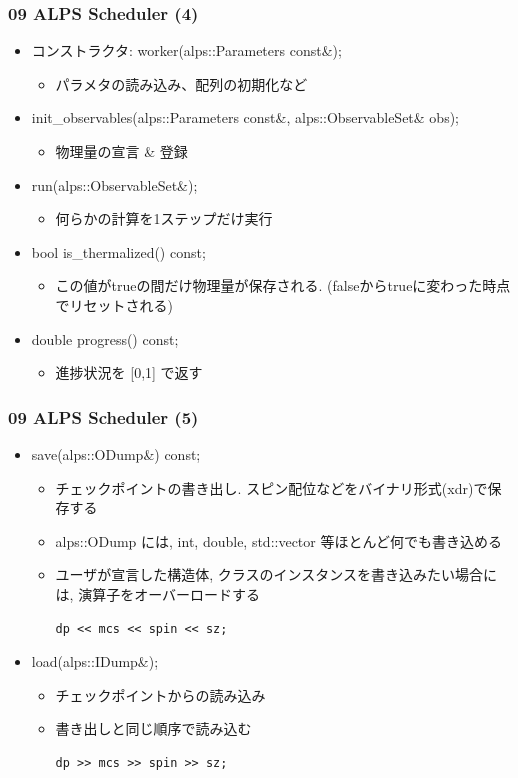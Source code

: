 \begin{frame}[fragile]
  \frametitle{09 ALPS Scheduler (4)}
  \begin{itemize}
    \item コンストラクタ: worker(alps::Parameters const\&);
      \begin{itemize}
        \item パラメタの読み込み、配列の初期化など
      \end{itemize}
    \item init\_observables(alps::Parameters const\&, alps::ObservableSet\& obs);
      \begin{itemize}
        \item 物理量の宣言 \& 登録
      \end{itemize}
    \item run(alps::ObservableSet\&);
      \begin{itemize}
        \item 何らかの計算を1ステップだけ実行
      \end{itemize}
    \item bool is\_thermalized() const;
      \begin{itemize}
        \item この値がtrueの間だけ物理量が保存される. (falseからtrueに変わった時点でリセットされる)
      \end{itemize}
    \item double progress() const;
      \begin{itemize}
        \item 進捗状況を [0,1] で返す
      \end{itemize}
  \end{itemize}
\end{frame}

\begin{frame}[fragile]
  \frametitle{09 ALPS Scheduler (5)}
  \begin{itemize}
    \item save(alps::ODump\&) const;
      \begin{itemize}
        \item チェックポイントの書き出し. スピン配位などをバイナリ形式(xdr)で保存する
        \item alps::ODump には, int, double, std::vector 等ほとんど何でも書き込める
        \item ユーザが宣言した構造体, クラスのインスタンスを書き込みたい場合には, 演算子をオーバーロードする
\begin{lstlisting}
dp << mcs << spin << sz;
\end{lstlisting}
      \end{itemize}
    \item load(alps::IDump\&);
      \begin{itemize}
        \item チェックポイントからの読み込み
        \item 書き出しと同じ順序で読み込む
\begin{lstlisting}
dp >> mcs >> spin >> sz;
\end{lstlisting}
      \end{itemize}
  \end{itemize}
\end{frame}

